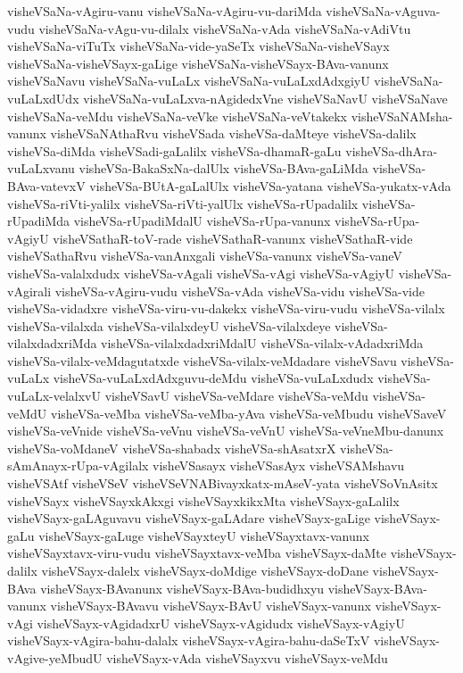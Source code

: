 {visheVSaNa-vAgiru-vanu
visheVSaNa-vAgiru-vu-dariMda
visheVSaNa-vAguva-vudu
visheVSaNa-vAgu-vu-dilalx
visheVSaNa-vAda
visheVSaNa-vAdiVtu
visheVSaNa-viTuTx
visheVSaNa-vide-yaSeTx
visheVSaNa-visheVSayx
visheVSaNa-visheVSayx-gaLige
visheVSaNa-visheVSayx-BAva-vanunx
visheVSaNavu
visheVSaNa-vuLaLx
visheVSaNa-vuLaLxdAdxgiyU
visheVSaNa-vuLaLxdUdx
visheVSaNa-vuLaLxva-nAgidedxVne
visheVSaNavU
visheVSaNave
visheVSaNa-veMdu
visheVSaNa-veVke
visheVSaNa-veVtakekx
visheVSaNAMsha-vanunx
visheVSaNAthaRvu
visheVSada
visheVSa-daMteye
visheVSa-dalilx
visheVSa-diMda
visheVSadi-gaLalilx
visheVSa-dhamaR-gaLu
visheVSa-dhAra-vuLaLxvanu
visheVSa-BakaSxNa-dalUlx
visheVSa-BAva-gaLiMda
visheVSa-BAva-vatevxV
visheVSa-BUtA-gaLalUlx
visheVSa-yatana
visheVSa-yukatx-vAda
visheVSa-riVti-yalilx
visheVSa-riVti-yalUlx
visheVSa-rUpadalilx
visheVSa-rUpadiMda
visheVSa-rUpadiMdalU
visheVSa-rUpa-vanunx
visheVSa-rUpa-vAgiyU
visheVSathaR-toV-rade
visheVSathaR-vanunx
visheVSathaR-vide
visheVSathaRvu
visheVSa-vanAnxgali
visheVSa-vanunx
visheVSa-vaneV
visheVSa-valalxdudx
visheVSa-vAgali
visheVSa-vAgi
visheVSa-vAgiyU
visheVSa-vAgirali
visheVSa-vAgiru-vudu
visheVSa-vAda
visheVSa-vidu
visheVSa-vide
visheVSa-vidadxre
visheVSa-viru-vu-dakekx
visheVSa-viru-vudu
visheVSa-vilalx
visheVSa-vilalxda
visheVSa-vilalxdeyU
visheVSa-vilalxdeye
visheVSa-vilalxdadxriMda
visheVSa-vilalxdadxriMdalU
visheVSa-vilalx-vAdadxriMda
visheVSa-vilalx-veMdagutatxde
visheVSa-vilalx-veMdadare
visheVSavu
visheVSa-vuLaLx
visheVSa-vuLaLxdAdxguvu-deMdu
visheVSa-vuLaLxdudx
visheVSa-vuLaLx-velalxvU
visheVSavU
visheVSa-veMdare
visheVSa-veMdu
visheVSa-veMdU
visheVSa-veMba
visheVSa-veMba-yAva
visheVSa-veMbudu
visheVSaveV
visheVSa-veVnide
visheVSa-veVnu
visheVSa-veVnU
visheVSa-veVneMbu-danunx
visheVSa-voMdaneV
visheVSa-shabadx
visheVSa-shAsatxrX
visheVSa-sAmAnayx-rUpa-vAgilalx
visheVSasayx
visheVSasAyx
visheVSAMshavu
visheVSAtf
visheVSeV
visheVSeVNABivayxkatx-mAseV-yata
visheVSoVnAsitx
visheVSayx
visheVSayxkAkxgi
visheVSayxkikxMta
visheVSayx-gaLalilx
visheVSayx-gaLAguvavu
visheVSayx-gaLAdare
visheVSayx-gaLige
visheVSayx-gaLu
visheVSayx-gaLuge
visheVSayxteyU
visheVSayxtavx-vanunx
visheVSayxtavx-viru-vudu
visheVSayxtavx-veMba
visheVSayx-daMte
visheVSayx-dalilx
visheVSayx-dalelx
visheVSayx-doMdige
visheVSayx-doDane
visheVSayx-BAva
visheVSayx-BAvanunx
visheVSayx-BAva-budidhxyu
visheVSayx-BAva-vanunx
visheVSayx-BAvavu
visheVSayx-BAvU
visheVSayx-vanunx
visheVSayx-vAgi
visheVSayx-vAgidadxrU
visheVSayx-vAgidudx
visheVSayx-vAgiyU
visheVSayx-vAgira-bahu-dalalx
visheVSayx-vAgira-bahu-daSeTxV
visheVSayx-vAgive-yeMbudU
visheVSayx-vAda
visheVSayxvu
visheVSayx-veMdu
}
